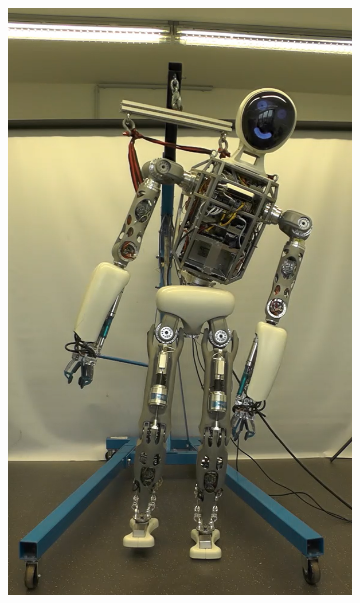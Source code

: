 \begin{figure}[h!]
\begin{subfigure}{.2\textwidth}
	\includegraphics[width=.95\linewidth]{experiments/balancing/3}
	\caption{}
	\end{subfigure}%
\begin{subfigure}{.2\textwidth}

\end{subfigure}
\end{figure}
